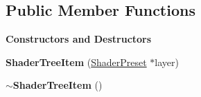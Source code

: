\subsection*{Public Member Functions}
\begin{Indent}\textbf{ Constructors and Destructors}\par
\begin{DoxyCompactItemize}
\item 
\mbox{\label{classrev_1_1_view_1_1_shader_tree_item_ae5c31af17dd32f93ee924c4dd2438c65}} 
{\bfseries Shader\+Tree\+Item} (\mbox{\hyperlink{classrev_1_1_shader_preset}{Shader\+Preset}} $\ast$layer)
\item 
\mbox{\label{classrev_1_1_view_1_1_shader_tree_item_ab4e2e34530c99c4b88bea19dbedb5fce}} 
{\bfseries $\sim$\+Shader\+Tree\+Item} ()
\end{DoxyCompactItemize}
\end{Indent}
